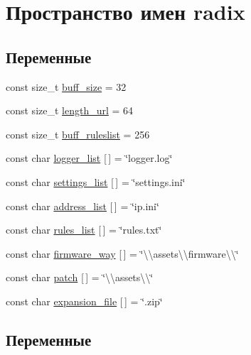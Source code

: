 \hypertarget{namespaceradix}{}\section{Пространство имен radix}
\label{namespaceradix}
\subsection*{Переменные}
\begin{DoxyCompactItemize}
\item 
const size\+\_\+t \hyperlink{namespaceradix_a82e81e89088b6430b7ec11a8a0329e9c}{buff\+\_\+size} = 32
\item 
const size\+\_\+t \hyperlink{namespaceradix_a21a5c4cd2370c706df61763c0069475a}{length\+\_\+url} = 64
\item 
const size\+\_\+t \hyperlink{namespaceradix_a8f000aabf647d34fd877c33958bad711}{buff\+\_\+ruleslist} = 256
\item 
const char \hyperlink{namespaceradix_a11c5bfe5c65a0f88a2a950111c6ffc09}{logger\+\_\+list} \mbox{[}$\,$\mbox{]} = \char`\"{}logger.\+log\char`\"{}
\item 
const char \hyperlink{namespaceradix_a43bff57dbd1b7dcebee0228ccbab7f17}{settings\+\_\+list} \mbox{[}$\,$\mbox{]} = \char`\"{}settings.\+ini\char`\"{}
\item 
const char \hyperlink{namespaceradix_ac613c223eba463145e088fbf5846e77f}{address\+\_\+list} \mbox{[}$\,$\mbox{]} = \char`\"{}ip.\+ini\char`\"{}
\item 
const char \hyperlink{namespaceradix_a73b088a3e903cc2845c2299b9ab8ccaf}{rules\+\_\+list} \mbox{[}$\,$\mbox{]} = \char`\"{}rules.\+txt\char`\"{}
\item 
const char \hyperlink{namespaceradix_a123392a7ece6e11efaf3ad3df291ff3d}{firmware\+\_\+way} \mbox{[}$\,$\mbox{]} = \char`\"{}\textbackslash{}\textbackslash{}assets\textbackslash{}\textbackslash{}firmware\textbackslash{}\textbackslash{}\char`\"{}
\item 
const char \hyperlink{namespaceradix_aa90f63f1d0143b58469670ccbb86cfc4}{patch} \mbox{[}$\,$\mbox{]} = \char`\"{}\textbackslash{}\textbackslash{}assets\textbackslash{}\textbackslash{}\char`\"{}
\item 
const char \hyperlink{namespaceradix_a01a09f0b88f6fd375ea20667bd318035}{expansion\+\_\+file} \mbox{[}$\,$\mbox{]} = \char`\"{}.zip\char`\"{}
\end{DoxyCompactItemize}


\subsection{Переменные}
\mbox{\label{namespaceradix_ac613c223eba463145e088fbf5846e77f}} 
